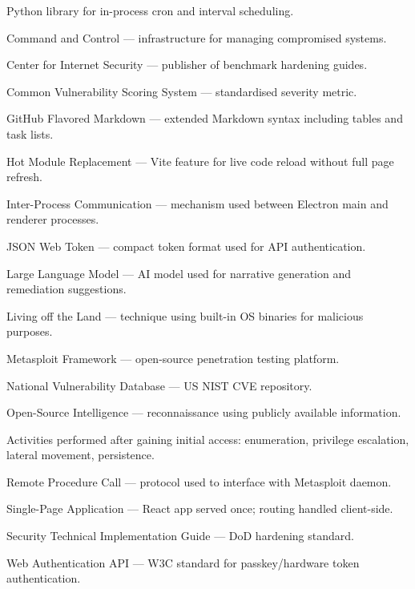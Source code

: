 \documentclass[11pt,a4paper,twoside,openright]{book}
\begin{document}
\begin{description}[leftmargin=!,labelwidth=\widthof{\textbf{post-exploitation}}]
  \item[APScheduler] Python library for in-process cron and interval scheduling.
  \item[C2] Command and Control — infrastructure for managing compromised systems.
  \item[CIS] Center for Internet Security — publisher of benchmark hardening guides.
  \item[CVSS] Common Vulnerability Scoring System — standardised severity metric.
  \item[GFM] GitHub Flavored Markdown — extended Markdown syntax including tables and task lists.
  \item[HMR] Hot Module Replacement — Vite feature for live code reload without full page refresh.
  \item[IPC] Inter-Process Communication — mechanism used between Electron main and renderer processes.
  \item[JWT] JSON Web Token — compact token format used for API authentication.
  \item[LLM] Large Language Model — AI model used for narrative generation and remediation suggestions.
  \item[LoTL] Living off the Land — technique using built-in OS binaries for malicious purposes.
  \item[MSF] Metasploit Framework — open-source penetration testing platform.
  \item[NVD] National Vulnerability Database — US NIST CVE repository.
  \item[OSINT] Open-Source Intelligence — reconnaissance using publicly available information.
  \item[post-exploitation] Activities performed after gaining initial access: enumeration, privilege escalation, lateral movement, persistence.
  \item[RPC] Remote Procedure Call — protocol used to interface with Metasploit daemon.
  \item[SPA] Single-Page Application — React app served once; routing handled client-side.
  \item[STIG] Security Technical Implementation Guide — DoD hardening standard.
  \item[WebAuthn] Web Authentication API — W3C standard for passkey/hardware token authentication.
\end{description}
\end{document}
